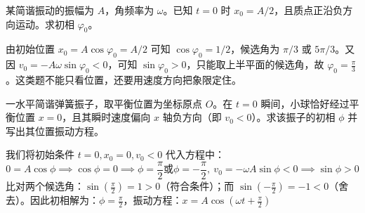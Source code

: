 \documentclass[lang=cn,11pt]{elegantbook}
\begin{document}
\begin{exercise}[由位置和速度确定初相]
某简谐振动的振幅为 \(A\)，角频率为 \(\omega\)。已知 \(t=0\) 时 \(x_0=A/2\)，且质点正沿负方向运动。求初相 \(\varphi_0\)。
\end{exercise}

\begin{solution}
由初始位置 \(x_0=A\cos\varphi_0=A/2\) 可知 \(\cos\varphi_0=1/2\)，候选角为 \(\pi/3\) 或 \(5\pi/3\)。又因 \(v_0=-A\omega\sin\varphi_0<0\)，可知 \(\sin\varphi_0>0\)，只能取上半平面的候选角，故 \(\varphi_0=\frac{\pi}{3}\)。这类题不能只看位置，还要用速度方向把象限定住。
\end{solution}

\begin{example}
一水平简谐弹簧振子，取平衡位置为坐标原点 $O$。在 $t = 0$ 瞬间，小球恰好经过平衡位置 $x = 0$，且其瞬时速度偏向 $x$ 轴负方向（即 $v_0 < 0$）。求该振子的初相 $\phi$ 并写出其位置振动方程。
\end{example}
\begin{solution}
我们将初始条件 $t = 0, x_0 = 0, v_0 < 0$ 代入方程中：
$$0 = A \cos\phi \implies \cos\phi = 0\implies\phi = \frac{\pi}{2} \text{或} \phi = -\frac{\pi}{2},~v_0 = -\omega A \sin\phi <0 \implies\sin\phi > 0$$
比对两个候选角：$\sin\left(\frac{\pi}{2}\right) = 1 > 0$（符合条件）；而 $\sin\left(-\frac{\pi}{2}\right) = -1 < 0$（舍去）。因此初相解为：$\phi = \frac{\pi}{2}$，振动方程：$x = A \cos\left(\omega t + \frac{\pi}{2}\right)$
\end{solution}
\end{document}
